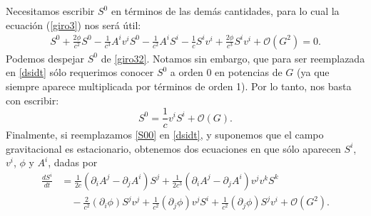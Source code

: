 Necesitamos escribir $S^0$ en términos de las demás cantidades, para lo cual la ecuación (\ref{giro3}) nos será útil:
\begin{align}
S^0+\frac{2\phi}{c^2}S^0-\frac{1}{c^3}A^iv^iS^0-\frac{1}{c^2}A^iS^i-\frac{1}{c}S^iv^i 
+\frac{2\phi}{c^3}S^iv^i+\mathcal{O}(G^2)=0.\label{giro32}
\end{align}
Podemos despejar $S^0$ de \eqref{giro32}. Notamos sin embargo, que para ser reemplazada en \eqref{dsidt} sólo requerimos conocer $S^0$ a orden 0 en potencias de $G$ (ya que siempre aparece multiplicada por términos de orden 1). Por lo tanto, nos basta con escribir:
\begin{equation}
S^0=\frac{1}{c}v^iS^i +\mathcal{O}(G).\label{S00}
\end{equation}
Finalmente, si reemplazamos \eqref{S00} %
en \eqref{dsidt}, y suponemos que el campo gravitacional es estacionario, 
obtenemos dos ecuaciones en que sólo aparecen $S^i$, $v^i$, $\phi$ y $A^i$, dadas por
\begin{align}
\frac{dS^{i}}{dt} &= \frac{1}{2c}\left(\partial_iA^j-\partial_jA^i\right)S^j + \frac{1}{2c^3}(\partial_iA^j-\partial_jA^i)v^jv^kS^k \nonumber \\
&\quad  -\frac{2}{c^2}(\partial_i\phi) S^jv^j+\frac{1}{c^2}(\partial_j\phi)v^jS^i+\frac{1}{c^2}(\partial_j\phi)S^jv^i+\mathcal{O}(G^2).\label{dsidt2}
\end{align}
